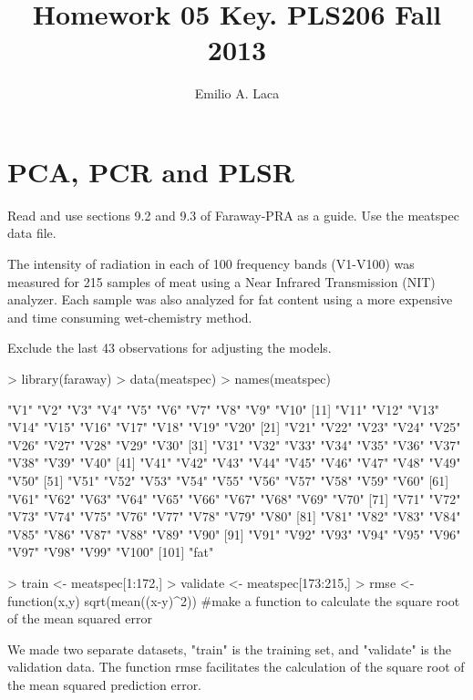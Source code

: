 \documentclass[letterpaper]{article}
\title{Homework 05 Key. PLS206 Fall 2013}
\author{Emilio A. Laca}
\begin{document}


\maketitle

\section{PCA, PCR and PLSR}
Read and use sections 9.2 and 9.3 of Faraway-PRA as a guide.
Use the meatspec data file.

The intensity of radiation in each of 100 frequency bands (V1-V100) was measured for 215 samples of meat using a Near Infrared Transmission (NIT) analyzer. Each sample was also analyzed for fat content using a more expensive and time consuming wet-chemistry method.

Exclude the last 43 observations for adjusting the models.

\begin{Schunk}
\begin{Sinput}
> library(faraway)
> data(meatspec)
> names(meatspec)
\end{Sinput}
\begin{Soutput}
  [1] "V1"   "V2"   "V3"   "V4"   "V5"   "V6"   "V7"   "V8"   "V9"   "V10" 
 [11] "V11"  "V12"  "V13"  "V14"  "V15"  "V16"  "V17"  "V18"  "V19"  "V20" 
 [21] "V21"  "V22"  "V23"  "V24"  "V25"  "V26"  "V27"  "V28"  "V29"  "V30" 
 [31] "V31"  "V32"  "V33"  "V34"  "V35"  "V36"  "V37"  "V38"  "V39"  "V40" 
 [41] "V41"  "V42"  "V43"  "V44"  "V45"  "V46"  "V47"  "V48"  "V49"  "V50" 
 [51] "V51"  "V52"  "V53"  "V54"  "V55"  "V56"  "V57"  "V58"  "V59"  "V60" 
 [61] "V61"  "V62"  "V63"  "V64"  "V65"  "V66"  "V67"  "V68"  "V69"  "V70" 
 [71] "V71"  "V72"  "V73"  "V74"  "V75"  "V76"  "V77"  "V78"  "V79"  "V80" 
 [81] "V81"  "V82"  "V83"  "V84"  "V85"  "V86"  "V87"  "V88"  "V89"  "V90" 
 [91] "V91"  "V92"  "V93"  "V94"  "V95"  "V96"  "V97"  "V98"  "V99"  "V100"
[101] "fat" 
\end{Soutput}
\begin{Sinput}
> train <- meatspec[1:172,]
> validate <- meatspec[173:215,]
> rmse <- function(x,y) sqrt(mean((x-y)^2)) #make a function to calculate the square root of the mean squared error
\end{Sinput}
\end{Schunk}

 We made two separate datasets, "train" is the training set, and "validate" is the validation data. The function rmse facilitates the calculation of the square root of the mean squared prediction error.
\end{document}
